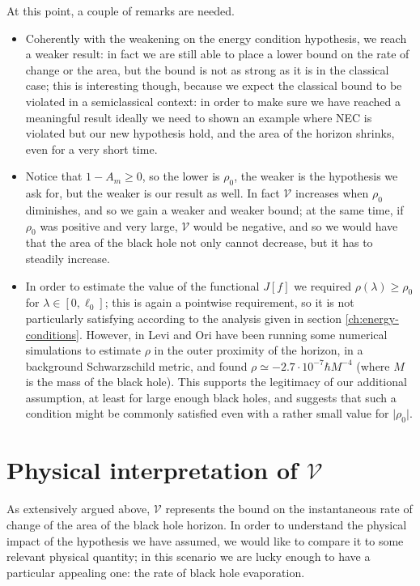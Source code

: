 \begin{remark}
	At this point, a couple of remarks are needed. 

	\begin{itemize}
		\item[\ding{99}] Coherently with the weakening on the energy condition hypothesis, we reach a weaker result: in fact we are still able to place a lower bound on the rate of change or the area, but the bound is not as strong as it is in the classical case; this is interesting though, because we expect the classical bound to be violated in a semiclassical context: in order to make sure we have reached a meaningful result ideally we need to shown an example where NEC is violated but our new hypothesis hold, and the area of the horizon shrinks, even for a very short time.
  		\item[\ding{99}] Notice that \(1-A_m \ge 0\), so the lower is \(\rho_0\), the weaker is the hypothesis we ask for, but the weaker is our result as well. In fact \(\mathcal{V}\) increases when \(\rho_0\) diminishes, and so we gain a weaker and weaker bound; at the same time, if \(\rho_0\) was positive and very large, \(\mathcal{V}\) would be negative, and so we would have that the area of the black hole not only cannot decrease, but it has to steadily increase.
    	\item[\ding{99}] In order to estimate the value of the functional \(J[f]\) we required \(\rho (\lambda)\ge\rho_0\) for \(\lambda\in [0, \ell_0]\); this is again a pointwise requirement, so it is not particularly satisfying according to the analysis given in section \ref{ch:energy-conditions}. However, in \cite{levi2016versatile} Levi and Ori have been running some numerical simulations to estimate \(\rho\) in the outer proximity of the horizon, in a background Schwarzschild metric, and found \(\rho \simeq -2.7\cdot 10^{-7} \hbar M^{-4}\) (where \(M\) is the mass of the black hole). This supports the legitimacy of our additional assumption, at least for large enough black holes, and suggests that such a condition might be commonly satisfied even with a rather small value for \(\vert\rho_0\vert\).
	\end{itemize}
	
\end{remark}

\section[physical-interpretation-V]{Physical interpretation of \(\mathcal{V}\)}
\label{sec:physical-interpretation-V}
As extensively argued above, \(\mathcal{V}\) represents the bound on the instantaneous rate of change of the area of the black hole horizon. In order to understand the physical impact of the hypothesis we have assumed, we would like to compare it to some relevant physical quantity; in this scenario we are lucky enough to have a particular appealing one: the rate of black hole evaporation.


